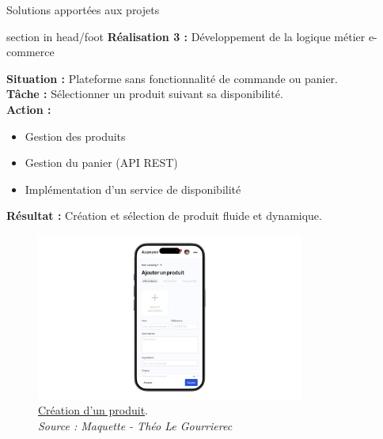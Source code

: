 \documentclass{beamer}
\begin{document}
\begin{frame}{Solutions apportées aux projets}
	\begin{beamercolorbox}[wd=\paperwidth,ht=1.5em,dp=0.5em,leftskip=0.5cm]{section in head/foot}
  		\large \textbf{Réalisation 3 :} \normalsize Développement de la logique métier e-commerce
	\end{beamercolorbox}
	\vspace{0.5em}
	\begin{center}
		 {
  			\begin{minipage}{0.9\textwidth}
  				\textbf{Situation :} Plateforme sans fonctionnalité de commande ou panier. \pause \\
  				\textbf{Tâche :} Sélectionner un produit suivant sa disponibilité. \pause \\
  				\textbf{Action :}
				\begin{itemize}
					\item Gestion des produits
					\item Gestion du panier (API REST)
					\item Implémentation d'un service de disponibilité
				\end{itemize}
				\pause

				\textbf{Résultat :} Création et sélection de produit fluide et dynamique.
  			\end{minipage}
  		}
  		
  		\only<5> {
			\begin{figure}[t]
  				\includegraphics[height=5.5cm]{../img/maquette/crud_produit.png}
				\caption{	
					\centering			
  					\href{https://github.com/Matteo-K/Soutenance_E-delic/blob/main/img/maquette/crud_produit.png}{\underline{Création d'un produit}}.\\
  					\textit{Source : Maquette - Théo Le Gourrierec}
				}
  				\label{fig:crud_produit}
  			\end{figure}
		}
		

\end{center}
\end{frame}
\end{document}
